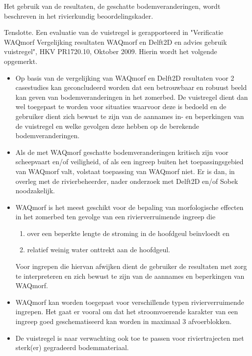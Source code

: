 Het gebruik van de resultaten, de geschatte bodemveranderingen, wordt beschreven in het rivierkundig beoordelingskader.

Tenslotte. Een evaluatie van de vuistregel is gerapporteerd in "Verificatie WAQmorf Vergelijking resultaten WAQmorf en Delft2D en advies gebruik vuistregel", HKV PR1720.10, Oktober 2009.
Hierin wordt het volgende opgemerkt.

\begin{itemize}

\item Op basis van de vergelijking van WAQmorf en Delft2D resultaten voor 2 casestudies kan geconcludeerd worden dat \dfastmi een betrouwbaar en robuust beeld kan geven van bodemveranderingen in het zomerbed.
De vuistregel dient dan wel toegepast te worden voor situaties waarvoor deze is bedoeld en de gebruiker dient zich bewust te zijn van de aannames in- en beperkingen van de vuistregel en welke gevolgen deze hebben op de berekende bodemveranderingen.

\item Als de met WAQmorf geschatte bodemveranderingen kritisch zijn voor scheepvaart en/of veiligheid, of als een ingreep buiten het toepassingsgebied van WAQmorf valt, volstaat toepassing van WAQmorf niet.
Er is dan, in overleg met de rivierbeheerder, nader onderzoek met Delft2D en/of Sobek noodzakelijk.

\item WAQmorf is het meest geschikt voor de bepaling van morfologische effecten in het zomerbed ten gevolge van een rivierverruimende ingreep die
\begin{enumerate}
\item over een beperkte lengte de stroming in de hoofdgeul be\"invloedt en
\item relatief weinig water onttrekt aan de hoofdgeul.
\end{enumerate}
Voor ingrepen die hiervan afwijken dient de gebruiker de resultaten met zorg te interpreteren en zich bewust te zijn van de aannames en beperkingen van WAQmorf.

\item WAQmorf kan worden toegepast voor verschillende typen rivierverruimende ingrepen.
Het gaat er vooral om dat het stroomvoerende karakter van een ingreep goed geschematiseerd kan worden in maximaal 3 afvoerblokken.

\item De vuistregel is naar verwachting ook toe te passen voor riviertrajecten met sterk(er) gegradeerd bodemmateriaal.
\end{itemize}

